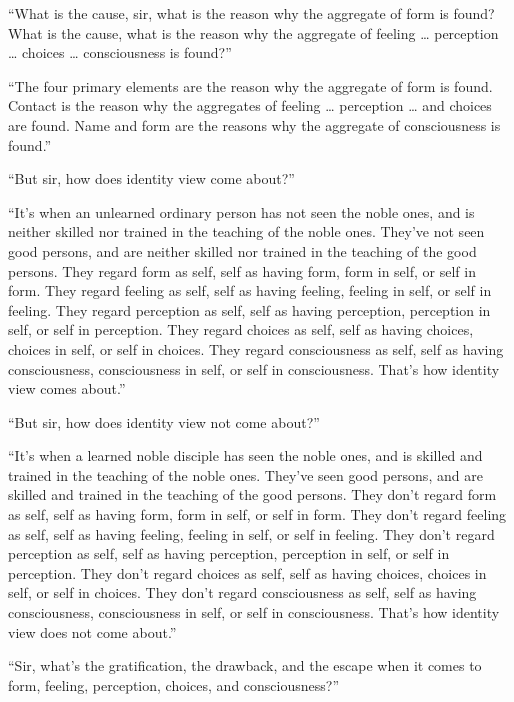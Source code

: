 \documentclass[12pt,openany]{book}%
\begin{document}
“What is the cause, sir, what is the reason why the aggregate of form is found? What is the cause, what is the reason why the aggregate of feeling … perception … choices … consciousness is found?” 

“The four primary elements are the reason why the aggregate of form is found. Contact is the reason why the aggregates of feeling … perception … and choices are found. Name and form are the reasons why the aggregate of consciousness is found.” 

“But sir, how does identity view come about?” 

“It’s when an unlearned ordinary person has not seen the noble ones, and is neither skilled nor trained in the teaching of the noble ones. They’ve not seen good persons, and are neither skilled nor trained in the teaching of the good persons. They regard form as self, self as having form, form in self, or self in form. They regard feeling as self, self as having feeling, feeling in self, or self in feeling. They regard perception as self, self as having perception, perception in self, or self in perception. They regard choices as self, self as having choices, choices in self, or self in choices. They regard consciousness as self, self as having consciousness, consciousness in self, or self in consciousness. That’s how identity view comes about.” 

“But sir, how does identity view not come about?” 

“It’s when a learned noble disciple has seen the noble ones, and is skilled and trained in the teaching of the noble ones. They’ve seen good persons, and are skilled and trained in the teaching of the good persons. They don’t regard form as self, self as having form, form in self, or self in form. They don’t regard feeling as self, self as having feeling, feeling in self, or self in feeling. They don’t regard perception as self, self as having perception, perception in self, or self in perception. They don’t regard choices as self, self as having choices, choices in self, or self in choices. They don’t regard consciousness as self, self as having consciousness, consciousness in self, or self in consciousness. That’s how identity view does not come about.” 

“Sir, what’s the gratification, the drawback, and the escape when it comes to form, feeling, perception, choices, and consciousness?” 
\end{document}
